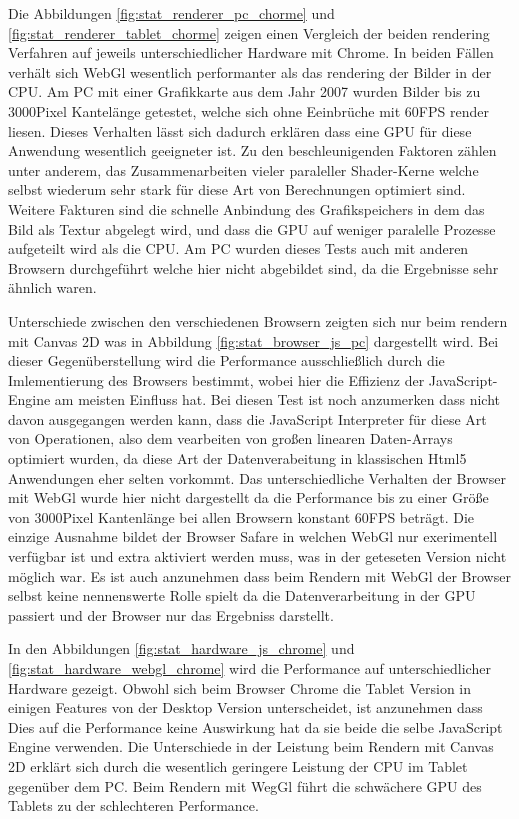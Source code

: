 Die Abbildungen \ref{fig:stat_renderer_pc_chorme} und \ref{fig:stat_renderer_tablet_chorme} zeigen einen Vergleich der beiden rendering Verfahren auf jeweils unterschiedlicher Hardware mit Chrome.
In beiden Fällen verhält sich WebGl wesentlich performanter als das rendering der Bilder in der CPU.
Am PC mit einer Grafikkarte aus dem Jahr 2007 wurden Bilder bis zu 3000Pixel Kantelänge getestet, 
welche sich ohne Eeinbrüche mit 60FPS render liesen.
Dieses Verhalten lässt sich dadurch erklären dass eine GPU für diese Anwendung wesentlich geeigneter ist.
Zu den beschleunigenden Faktoren zählen unter anderem, das Zusammenarbeiten vieler paraleller Shader-Kerne welche selbst wiederum sehr stark für diese Art von Berechnungen optimiert sind.
Weitere Fakturen sind die schnelle Anbindung des Grafikspeichers in dem das Bild als Textur abgelegt wird, und dass die GPU auf weniger paralelle Prozesse aufgeteilt wird als die CPU.
Am PC wurden dieses Tests auch mit anderen Browsern durchgeführt welche hier nicht abgebildet sind, da die Ergebnisse sehr ähnlich waren.

Unterschiede zwischen den verschiedenen Browsern zeigten sich nur beim rendern mit Canvas 2D was in Abbildung \ref{fig:stat_browser_js_pc} dargestellt wird.
Bei dieser Gegenüberstellung wird die Performance ausschließlich durch die Imlementierung des Browsers bestimmt,
wobei hier die Effizienz der JavaScript-Engine am meisten Einfluss hat.
Bei diesen Test ist noch anzumerken dass nicht davon ausgegangen werden kann, 
dass die JavaScript Interpreter für diese Art von Operationen, 
also dem vearbeiten von großen linearen Daten-Arrays optimiert wurden, 
da diese Art der Datenverabeitung in klassischen Html5 Anwendungen eher selten vorkommt.
Das unterschiedliche Verhalten der Browser mit WebGl wurde hier nicht dargestellt da die Performance bis zu einer Größe von 3000Pixel Kantenlänge bei allen Browsern konstant 60FPS beträgt.
Die einzige Ausnahme bildet der Browser Safare in welchen WebGl nur exerimentell verfügbar ist und extra aktiviert werden muss, was in der geteseten Version nicht möglich war.
Es ist auch anzunehmen dass beim Rendern mit WebGl der Browser selbst keine nennenswerte Rolle spielt da die Datenverarbeitung in der GPU passiert und der Browser nur das Ergebniss darstellt.

In den Abbildungen \ref{fig:stat_hardware_js_chrome} und \ref{fig:stat_hardware_webgl_chrome} wird die Performance auf unterschiedlicher Hardware gezeigt.
Obwohl sich beim Browser Chrome die Tablet Version in einigen Features von der Desktop Version unterscheidet, 
ist anzunehmen dass Dies auf die Performance keine Auswirkung hat da sie beide die selbe JavaScript Engine verwenden.
Die Unterschiede in der Leistung beim Rendern mit Canvas 2D erklärt sich durch die wesentlich geringere Leistung der CPU im Tablet gegenüber dem PC.
Beim Rendern mit WegGl führt die schwächere GPU des Tablets zu der schlechteren Performance.

